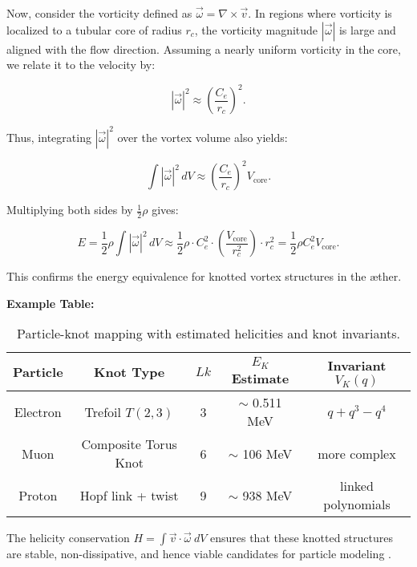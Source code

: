 Now, consider the vorticity defined as $\vec{\omega} = \nabla \times \vec{v}$.
In regions where vorticity is localized to a tubular core of radius $r_c$, the vorticity magnitude $|\vec{\omega}|$ is large and aligned with the flow direction. Assuming a nearly uniform vorticity in the core, we relate it to the velocity by:

\begin{equation}
    |\vec{\omega}|^2 \approx \left(\frac{C_e}{r_c}\right)^2.
\end{equation}

Thus, integrating $|\vec{\omega}|^2$ over the vortex volume also yields:

\begin{equation}
    \int |\vec{\omega}|^2 \, dV \approx \left(\frac{C_e}{r_c}\right)^2 V_{\text{core}}.
\end{equation}

Multiplying both sides by $\frac{1}{2} \rho$ gives:

\begin{equation}
    E = \frac{1}{2} \rho \int |\vec{\omega}|^2 \, dV \approx \frac{1}{2} \rho \cdot C_e^2 \cdot \left(\frac{V_{\text{core}}}{r_c^2}\right) \cdot r_c^2 = \frac{1}{2} \rho C_e^2 V_{\text{core}}.
\end{equation}

This confirms the energy equivalence for knotted vortex structures in the æther.

\textbf{Example Table:}

\begin{table}[h!]
    \centering
    \begin{tabular}{|c|c|c|c|c|}
        \hline
        \textbf{Particle} & \textbf{Knot Type} & $Lk$ & $E_K$ Estimate & Invariant $V_K(q)$ \\
        \hline
        Electron & Trefoil $T(2,3)$ & 3 & $\sim$ 0.511 MeV & $q + q^3 - q^4$ \\
        Muon & Composite Torus Knot & 6 & $\sim$ 106 MeV & more complex \\
        Proton & Hopf link + twist & 9 & $\sim$ 938 MeV & linked polynomials \\
        \hline
    \end{tabular}
    \caption{Particle-knot mapping with estimated helicities and knot invariants.}
\end{table}

The helicity conservation $H = \int \vec{v} \cdot \vec{\omega} \ dV$ ensures that these knotted structures are stable, non-dissipative, and hence viable candidates for particle modeling \cite{Moffatt1969,Ricca1992}.